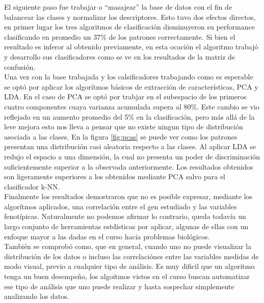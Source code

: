 \documentclass[12pt,a4paper,titlepage]{report}
\begin{document}
El siguiente paso fue trabajar o ``masajear'' la base de datos con el fin de balancear las clases y normalizar los descriptores. Esto tuvo dos efectos directos, en primer lugar los tres algoritmos de clasificación disminuyeron su performance clasificando en promedio un 37\% de los patrones correctamente. Si bien el resultado es inferor al obtenido previamente, en esta ocación el algoritmo trabajó y desarrollo sus clasificadores como se ve en los resultados de la matriz de confusión.\\

Una vez con la base trabajada y los calsificadores trabajando como es esperable se optó por aplicar los algorítmos básicos de extracción de características, PCA y LDA. En el caso de PCA se optó por trabjar en el subespacio de los primeros cuatro componentes cuaya varianza acumulada supera al 80\%. Este cambio se vio reflejado en un aumento promedio del 5\% en la clasificación, pero más allá de la leve mejora esto nos lleva a pensar que no existe ningun tipo de distribución asociada a las clases. En la figura \ref{fig:pcas} se puede ver como los patrones presentan una distribución casi aleatoria respecto a las clases. Al aplicar LDA se redujo el espacio a una dimensión, la cual no presenta un poder de discriminación suficientemente superior a la observada anteriormente. Los resultados obtenidos son ligeramente superiores a los obtenidos mediante PCA salvo para el clasificador k-NN.\\

Finalmente los resultados demostraron que no es posible expresar, mediante los algorítmos aplicados, una correlación entre el gen estudiado y las variables fenotípicas. Naturalmente no podemos afirmar lo contrario, queda todavía un largo conjunto de herramientas estdísticas por aplicar, algunas de ellas con un enfoque mayor a las dadas en el curso hacia problemas biológicos.\\

También se comprobó como, que en general, cuando uno no puede visualizar la distribución de los datos o incluso las correlaciónes entre las variables medidas de modo visual, previo a cualquier tipo de análisis. Es muy dificil que un algoritmo tenga un buen desempeño, los algoitmos vistos en el curso buscan automatizar ese tipo de análisis que uno puede realizar y hasta sospechar simplemente analizando los datos.
\end{document}
